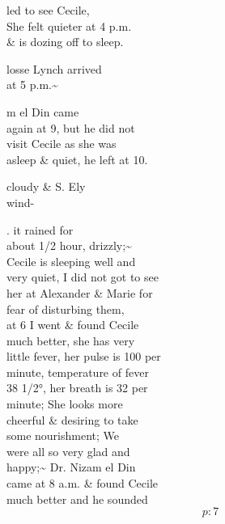 \documentclass{report}
\begin{document}



	\par{
 	led to see Cecile,\ \\She felt quieter at 4 p.m.\ \\\& is dozing off to sleep.\ \\
	}

	\par{
 	losse Lynch arrived\ \\at 5 p.m.\~{}\ \\
	}

	\par{
 	m el Din came\ \\again at 9, but he did not\ \\visit Cecile as she was\ \\asleep \& quiet, he left at 10.\ \\
	}

	\par{
 	cloudy \& S. Ely\ \\wind-\ \\
	}


	\par{
 	. it rained for\ \\about 1/2 hour, drizzly;\~{}\ \\Cecile is sleeping well and\ \\very quiet, I did not got to see\ \\her at Alexander \& Marie for\ \\fear of disturbing them,\ \\at 6 I went \& found Cecile\ \\much better, she has very\ \\little fever, her pulse is 100 per\ \\minute, temperature of fever\ \\38 1/2°, her breath is 32 per\ \\minute; She looks more\ \\cheerful \& desiring to take\ \\some nourishment; We\ \\were all so very glad and\ \\happy;\~{} Dr. Nizam el Din\ \\came at 8 a.m. \& found Cecile\ \\much better and he sounded\ \\
  \[p: 7 \]

	}
\end{document}

